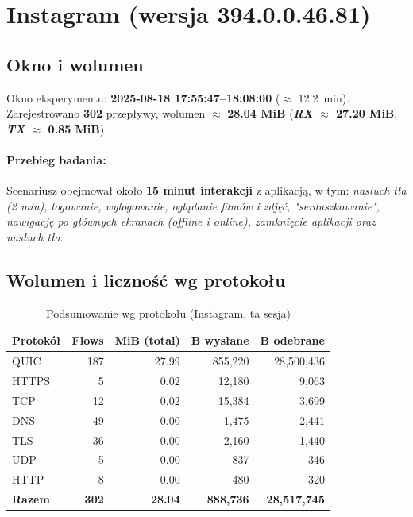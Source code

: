 \section{Instagram (wersja 394.0.0.46.81)}
\label{sec:instagram}

\subsection*{Okno i wolumen}
Okno eksperymentu: \textbf{2025-08-18 17{:}55:47–18{:}08:00} ($\approx$ \SI{12.2}{\minute}). 
Zarejestrowano \textbf{302} przepływy, wolumen $\approx$ \textbf{28.04 MiB} 
(\textbf{\emph{RX} $\approx$ 27.20 MiB}, \textbf{\emph{TX} $\approx$ 0.85 MiB}).

\paragraph{Przebieg badania:} 
Scenariusz obejmował około \textbf{15 minut interakcji} z aplikacją, w tym: 
\emph{nasłuch tła (2 min), logowanie, wylogowanie, oglądanie filmów i zdjęć, "serduszkowanie", nawigację po głównych ekranach (offline i online), zamknięcie aplikacji oraz nasłuch tła}.

\subsection{Wolumen i liczność wg protokołu}
\begin{table}[H]
  \centering
  \caption{Podsumowanie wg protokołu (Instagram, ta sesja)}
  \label{tab:insta-proto}
  \begin{tabular}{lrrrr}
    \toprule
    \textbf{Protokół} & \textbf{Flows} & \textbf{MiB (total)} & \textbf{B wysłane} & \textbf{B odebrane} \\
    \midrule
    QUIC  & 187 & 27.99 & 855{,}220 & 28{,}500{,}436 \\
    HTTPS & 5   & 0.02  & 12{,}180  & 9{,}063 \\
    TCP   & 12  & 0.02  & 15{,}384  & 3{,}699 \\
    DNS   & 49  & 0.00  & 1{,}475   & 2{,}441 \\
    TLS   & 36  & 0.00  & 2{,}160   & 1{,}440 \\
    UDP   & 5   & 0.00  & 837       & 346 \\
    HTTP  & 8   & 0.00  & 480       & 320 \\
    \midrule
    \textbf{Razem} & \textbf{302} & \textbf{28.04} & \textbf{888{,}736} & \textbf{28{,}517{,}745} \\
    \bottomrule
  \end{tabular}
\end{table}

